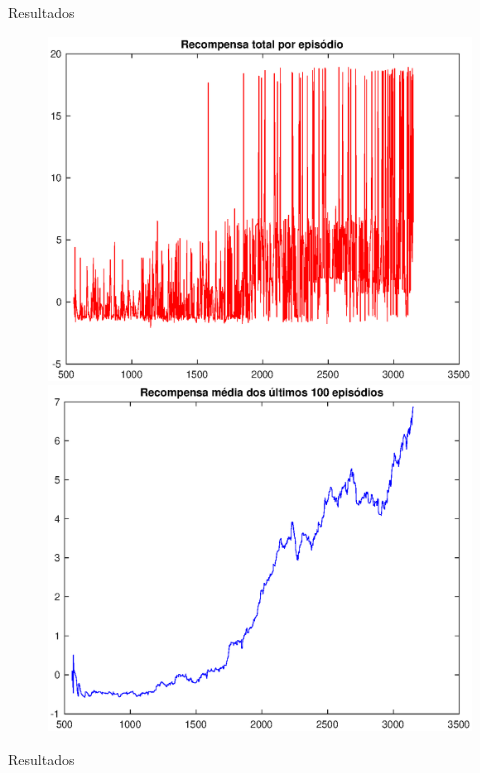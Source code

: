 \documentclass[aspectratio=169]{beamer}
\begin{document}
\begin{frame}{Resultados}
	\begin{figure}[h]
  \centering
  \includegraphics[width=.5 \textwidth]{imgs/resultados/historico_recompensa_v1.eps}
  \includegraphics[width=.5 \textwidth]{imgs/resultados/resompensa_media_100_epis_v1.eps}
  \label{fig:resultados_v1}
\end{figure}
\end{frame}

\begin{frame}{Resultados}
	\begin{figure}
		\centering
	\end{figure}
\end{frame}
\end{document}
